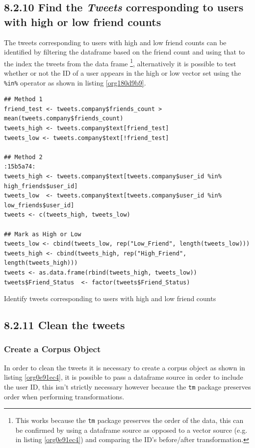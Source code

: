 \documentclass[11pt]{article}
\begin{document}
\subsection{8.2.10 Find the \emph{Tweets} corresponding to users with high or low friend counts}
\label{sec:orgabbe6b8}
The tweets corresponding to users with high and low friend counts can be
identified by filtering the dataframe based on the friend count and using that
to the index the tweets from the data frame \footnote{This works because the \texttt{tm} package preserves the order of the data, this can be confirmed by using a dataframe source as opposed to a vector source (e.g. in listing \ref{org0e91ec4}) and comparing the ID's before/after transformation.}, alternatively it is possible
to test whether or not the ID of a user appears in the high or low vector
set using the \texttt{\%in\%} operator as shown in listing \ref{org180d9b9}.

\begin{listing}[htbp]
\begin{verbatim}
## Method 1
friend_test <- tweets.company$friends_count > mean(tweets.company$friends_count)
tweets_high <- tweets.company$text[friend_test]
tweets_low <- tweets.company$text[!friend_test]

## Method 2                                                                 :15b5a74:
tweets_high <- tweets.company$text[tweets.company$user_id %in%  high_friends$user_id]
tweets_low  <- tweets.company$text[tweets.company$user_id %in%  low_friends$user_id]
tweets <- c(tweets_high, tweets_low)

## Mark as High or Low
tweets_low <- cbind(tweets_low, rep("Low_Friend", length(tweets_low)))
tweets_high <- cbind(tweets_high, rep("High_Friend", length(tweets_high)))
tweets <- as.data.frame(rbind(tweets_high, tweets_low))
tweets$Friend_Status  <- factor(tweets$Friend_Status)
\end{verbatim}
\caption{\label{org180d9b9}Identify tweets corresponding to users with high and low friend counts}
\end{listing}

\subsection{8.2.11 Clean the tweets}
\label{sec:org69e4449}
\subsubsection{Create a Corpus Object}
\label{sec:org89a3028}
In order to clean the tweets it is necessary to create a corpus object as shown in listing \ref{org0e91ec4}, it is possible to pass a dataframe source in order to include the user ID, this isn't strictly necessary however because the \texttt{tm} package preserves order when performing transformations.
\end{document}
